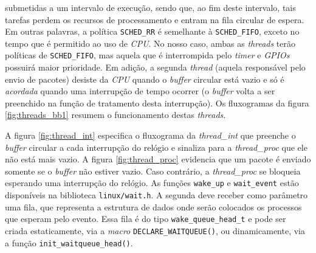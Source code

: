 submetidas a um intervalo de execução, sendo que, ao fim deste intervalo, tais
tarefas perdem os recursos de processamento e entram na fila circular de espera.
Em outras palavras, a política \texttt{SCHED\_RR} é semelhante à
\texttt{SCHED\_FIFO}, exceto no tempo que é permitido ao uso de \textit{CPU}. No
nosso caso, ambas as \textit{threads} terão políticas de \texttt{SCHED\_FIFO},
mas aquela que é interrompida pelo \textit{timer} e
\textit{GPIOs} possuirá maior prioridade. Em adição, a segunda \textit{thread}
(aquela responsável pelo envio de pacotes) desiste da \textit{CPU} quando o
\textit{buffer} circular está vazio e só é \textit{acordada} quando uma
interrupção de tempo ocorrer (o \textit{buffer} volta a ser preenchido na função de
tratamento desta interrupção). Os fluxogramas da figura \ref{fig:threads_bb1}
resumem o funcionamento destas \textit{threads}.

\vspace{12pt}

A figura \ref{fig:thread_int} especifica o fluxograma da \textit{thread\_int}
que preenche o \textit{buffer} circular a cada interrupção do relógio e sinaliza
para a \textit{thread\_proc} que ele não está mais vazio. A figura
\ref{fig:thread_proc} evidencia que um pacote é enviado somente se o
\textit{buffer} não estiver vazio. Caso contrário, a \textit{thread\_proc}
se bloqueia esperando uma interrupção do relógio. As funções \texttt{wake\_up} e
\texttt{wait\_event} estão disponíveis na biblioteca \texttt{linux/wait.h}. A
segunda deve receber como parâmetro uma fila, que representa a estrutura de
dados onde serão colocados os processos que esperam pelo evento. Essa fila é do
tipo \texttt{wake\_queue\_head\_t} e pode ser criada estaticamente, via
a \textit{macro} \texttt{DECLARE\_WAITQUEUE()}, ou dinamicamente, via a função
\texttt{init\_waitqueue\_head()}.

